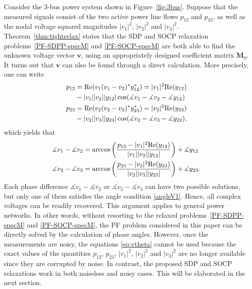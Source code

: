 \documentclass[journal,twoside]{IEEEtran}
\newcommand{\re}{{\rm Re}}
\newcommand{\bv}{\mathbf{v}}
\newcommand{\bM}{\mathbf{M}}
\begin{document}
Consider the 3-bus power system shown in Figure~\ref{fig:3bus}.
Suppose that the measured signals consist of  the two active power line flows $p_{12}$ and $p_{23}$, as well as the nodal voltage squared magnitudes
$|v_1|^2$, $|v_2|^2$ and $|v_3|^2$. Theorem~\ref{thm:tightrelax} states that the SDP and SOCP relaxation problems~\eqref{PF-SDPP-specM} and \eqref{PF-SOCP-specM} are both able to find the unknown voltage vector $\bv$, using an appropriately designed coefficient matrix $\bM_0$. It turns out that $\bv$ can also be found through a direct calculation. More precisely, one can write
\begin{subequations}\label{eq:ptheta}
\begin{align}
  p_{12} &= \re(v_1(v_1-v_2)^{*}y_{12}^{*})= |v_1|^2\re(y_{12})  \notag \\
         &- |v_1||v_2||y_{12}|\cos(\measuredangle v_{1}-\measuredangle v_{2}-\measuredangle y_{12}) \\
  p_{23} &= \re(v_2(v_2-v_3)^{*}y_{23}^{*}) = |v_2|^2\re(y_{23})\notag \\
      &    - |v_2||v_3||y_{23}|\cos(\measuredangle v_{2}-\measuredangle v_{3}-\measuredangle y_{23}),
\end{align}
\end{subequations}
which yields that
\begin{subequations}\label{eq:vtheta}
\begin{align}
\measuredangle v_{1}-\measuredangle v_{2}&= \arccos\left(\frac{p_{12}-|v_1|^2\re(y_{12})}{|v_1||v_2||y_{12}|}\right) +\measuredangle y_{12} \\
\measuredangle v_{2}-\measuredangle v_{3} &= \arccos\left(\frac{p_{23}-|v_2|^2\re(y_{23})}{|v_2||v_3||y_{23}|}\right)+ \measuredangle y_{23}.
\end{align}
\end{subequations}
Each phase difference $\measuredangle v_{1}-\measuredangle v_{2}$ or $\measuredangle v_{2}-\measuredangle v_{3}$ can have two possible solutions,
but only one of them satisfies the angle condition \eqref{angleV1}. Hence, all complex voltages can be readily recovered.
This argument applies to general power networks. In other words, without resorting to the relaxed problems~\eqref{PF-SDPP-specM} and \eqref{PF-SOCP-specM},
the PF problem considered in this paper can be directly solved by the calculation of phase angles.
However, once the measurements are noisy, the equations \eqref{eq:vtheta} cannot be used because the exact values of the quantities $p_{12}$, $p_{23}$, $|v_1|^2$, $|v_2|^2$ and $|v_3|^2$ are no longer available since they are corrupted by noise.
In contrast, the proposed SDP and SOCP relaxations work in both noiseless and noisy cases. This will be elaborated in the next section.
\end{document}
